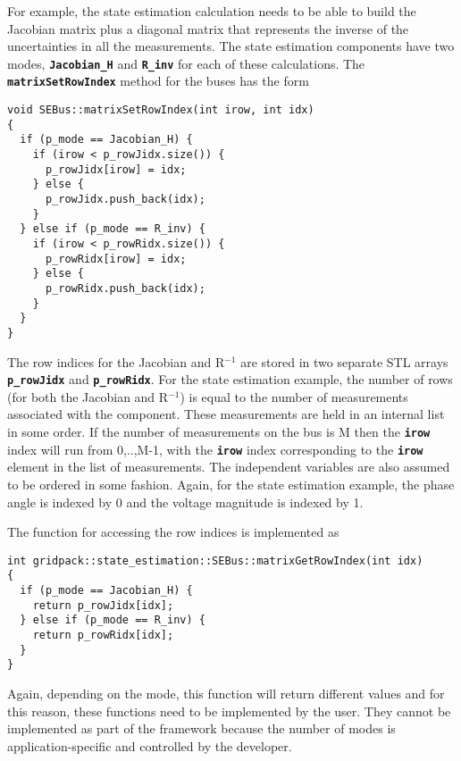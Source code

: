 For example, the state estimation calculation needs to be able to build the Jacobian matrix plus a diagonal matrix that represents the inverse of the uncertainties in all the measurements. The state estimation components have two modes, \texttt{\textbf{Jacobian\_H}} and \texttt{\textbf{R\_inv}} for each of these calculations. The \texttt{\textbf{matrixSetRowIndex}} method for the buses has the form

{
\color{red}
\begin{Verbatim}[fontseries=b]
void SEBus::matrixSetRowIndex(int irow, int idx)
{
  if (p_mode == Jacobian_H) {
    if (irow < p_rowJidx.size()) {
      p_rowJidx[irow] = idx;
    } else {
      p_rowJidx.push_back(idx);
    }
  } else if (p_mode == R_inv) {
    if (irow < p_rowRidx.size()) {
      p_rowRidx[irow] = idx;
    } else {
      p_rowRidx.push_back(idx);
    }
  }
}
\end{Verbatim}
}

The row indices for the Jacobian and R${}^{-1}$ are stored in two separate STL arrays \texttt{\textbf{p\_rowJidx}} and \texttt{\textbf{p\_rowRidx}}. For the state estimation example, the number of rows (for both the Jacobian and R${}^{-1}$) is equal to the number of measurements associated with the component. These measurements are held in an internal list in some order. If the number of measurements on the bus is M then the \texttt{\textbf{irow}} index will run from 0,..,M-1, with the \texttt{\textbf{irow}} index corresponding to the \texttt{\textbf{irow}} element in the list of measurements. The independent variables are also assumed to be ordered in some fashion. Again, for the state estimation example, the phase angle is indexed by 0 and the voltage magnitude is indexed by 1. 

The function for accessing the row indices is implemented as

{
\color{red}
\begin{Verbatim}[fontseries=b]
int gridpack::state_estimation::SEBus::matrixGetRowIndex(int idx)
{
  if (p_mode == Jacobian_H) {
    return p_rowJidx[idx];
  } else if (p_mode == R_inv) {
    return p_rowRidx[idx];
  }
}
\end{Verbatim}
}

Again, depending on the mode, this function will return different values and for this reason, these functions need to be implemented by the user. They cannot be implemented as part of the framework because the number of modes is application-specific and controlled by the developer.


